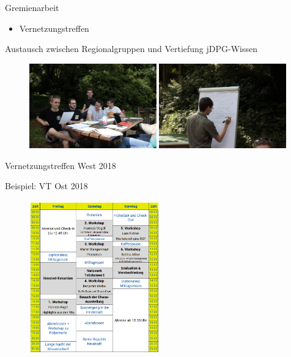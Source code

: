 \documentclass[
]{beamer}
\begin{document}
\begin{frame}{Gremienarbeit}
  \vfill

   \begin{minipage}{0.4\textwidth}
     \begin{itemize}
       \item Vernetzungstreffen
     \end{itemize}
     \begin{center}
      Austausch zwischen Regionalgruppen und Vertiefung jDPG-Wissen
     \end{center}
   \end{minipage}%
   \hfill
   \begin{minipage}{0.58\textwidth}
     \begin{figure}
       \centering
       \includegraphics[width=0.49\textwidth]{figure/VT-West-2018_Austausch}\hfill
       \includegraphics[width=0.49\textwidth]{figure/VT-West-2018_wissen}
      \end{figure}
      \begin{center}
       Vernetzungstreffen West 2018
     \end{center}
   \end{minipage}
\end{frame}


\begin{frame}{Beispiel: VT Ost 2018}
  \begin{figure}
   \centering
   \includegraphics[width=0.50\textwidth]{figure/programm_vtost}
  \end{figure}
\end{frame}
\end{document}
